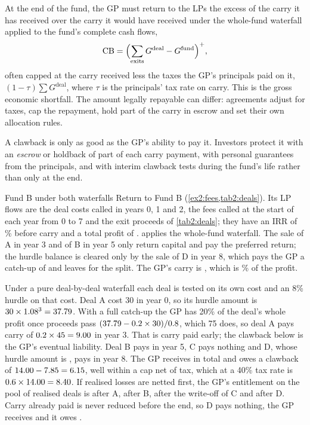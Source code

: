 \begin{chapterrefs}
\begin{definition}[Clawback]\label{def2:clawback}
At the end of the fund, the GP must return to the LPs the excess of the carry it has received over the
carry it would have received under the whole-fund waterfall applied to the fund's complete cash flows,
\begin{equation}\label{eq2:clawback}
  \mathrm{CB} = \Bigl(\sum_{\text{exits}} G^{\mathrm{deal}} - G^{\mathrm{fund}}\Bigr)^{+},
\end{equation}
often capped at the carry received less the taxes the GP's principals paid on it, $(1-\tau)\sum G^{\mathrm{deal}}$, where $\tau$ is the principals' tax rate on carry.
This is the gross economic shortfall. The amount legally repayable can differ: agreements adjust for
taxes, cap the repayment, hold part of the carry in escrow and set their own allocation rules.
\end{definition}

A clawback is only as good as the GP's ability to pay it. Investors protect it with an \emph{escrow} or
holdback of part of each carry payment, with personal guarantees from the principals, and with interim
clawback tests during the fund's life rather than only at the end.

\begin{example}{Fund B under both waterfalls}\label{ex2:fundb}
Return to Fund B (\cref{ex2:fees,tab2:deals}). Its LP flows are the deal costs called in years 0, 1 and 2, the fees called at the start
of each year from 0 to 7 and the exit proceeds of \cref{tab2:deals}; they have an IRR of \bGrossIrr\% before
carry and a total profit of \bProfit.  applies the whole-fund waterfall. The sale of A in
year 3 and of B in year 5 only return capital and pay the preferred return; the hurdle balance is
cleared only by the sale of D in year 8, which pays the GP a catch-up of \bWfCatchD{} and leaves \bWfSplitD{} for the
split. The GP's carry is \bWfCarry, which is \bWfShare\% of the profit.

Under a pure deal-by-deal waterfall each deal is tested on its own cost and an 8\% hurdle on that cost.
Deal A cost 30 in year 0, so its hurdle amount is $30\times1.08^3 = 37.79$. With a full catch-up the
GP has 20\% of the deal's whole profit once proceeds pass $(37.79 - 0.2\times30)/0.8$, which 75 does,
so deal A pays carry of $0.2\times45 = 9.00$ in year 3. That is carry paid early; the
clawback below is the GP's eventual liability. Deal B pays \bDealBCarry{} in year 5, C pays nothing and D, whose hurdle amount
is \bDealDHurdle, pays \bDealDCarry{} in year 8. The GP receives \bDbdCarry{} in total and owes a clawback
of $14.00 - 7.85 = 6.15$, well within a cap net of tax, which at a 40\% tax rate is $0.6\times14.00 =
8.40$. If realised losses are netted first, the GP's entitlement on the pool of realised deals is
\bPoolEntOne{} after A, \bPoolEntTwo{} after B, \bPoolEntThree{} after the write-off of C and \bPoolEntFour{}
after D. Carry already paid is never reduced before the end, so D pays nothing, the GP receives
\bPoolCarry{} and it owes \bPoolClaw.


\end{example}
\end{chapterrefs}
